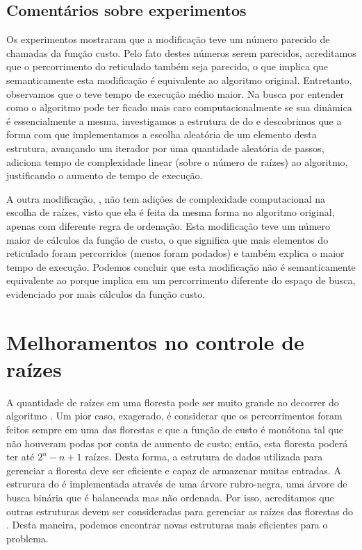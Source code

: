 \subsection{Comentários sobre experimentos}
Os experimentos mostraram que a modificação  teve um
número parecido de chamadas da função custo. Pelo fato destes números
serem parecidos, acreditamos que o percorrimento do reticulado também 
seja parecido, o que implica que semanticamente esta modificação é 
equivalente ao algoritmo original. Entretanto, observamos que o
 teve tempo de execução médio maior. Na busca por
entender como o algoritmo pode ter ficado mais caro computacionalmente
se sua dinâmica é essencialmente a mesma, investigamos a estrutura de
 do  e descobrimos que a forma com que implementamos 
a escolha aleatória de um elemento desta estrutura, avançando um 
iterador por uma quantidade aleatória de passos, adiciona tempo de 
complexidade linear (sobre o número de raízes) ao algoritmo, 
justificando o aumento de tempo de execução.

A outra modificação, , não tem adições de 
complexidade computacional na escolha de raízes, visto que ela é feita
da mesma forma no algoritmo original, apenas com diferente regra de 
ordenação. Esta modificação teve um número maior de cálculos da função
de custo, o que significa que mais elementos do reticulado foram
percorridos (menos foram podados) e também explica o maior tempo de 
execução. Podemos concluir que esta modificação não é semanticamente 
equivalente ao  porque implica em um percorrimento 
diferente do espaço de busca, evidenciado por mais cálculos da função 
custo.


\section{Melhoramentos no controle de raízes}
A quantidade de raízes em uma floresta pode ser muito grande no decorrer 
do algoritmo . Um pior caso, exagerado, é considerar que 
os percorrimentos foram feitos sempre em uma das florestas e que a 
função de custo é monótona tal que não houveram podas por conta de 
aumento de custo; então, esta floresta poderá ter até $2^n - n + 1$ 
raízes. Desta forma, a estrutura de dados utilizada para gerenciar a 
floresta deve ser eficiente e capaz de armazenar muitas entradas.
A estrurura  do 
 é implementada através de uma árvore rubro-negra, uma árvore de busca binária que é balanceada mas não ordenada. Por isso, acreditamos que outras estruturas devem ser consideradas para gerenciar as raízes das 
florestas do . Desta maneira, podemos encontrar novas 
estruturas mais eficientes para o problema.

